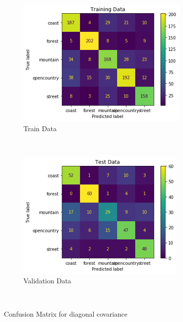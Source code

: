 


\begin{figure}[!h]
    \centering
    \begin{subfigure}[t]{0.5\textwidth}
        \centering
        \includegraphics[height=2.5in]{Dataset_2b/diagonal covariance train confusion matrix.png}
        \caption{Train Data}
    \end{subfigure}%
    ~ 
    \begin{subfigure}[t]{0.5\textwidth}
        \centering
        \includegraphics[height=2.5in]{Dataset_2b/diagonal covariance test confusion matrix.png}
        \caption{Validation Data}
    \end{subfigure}%
    ~
    \caption{Confusion Matrix for diagonal covariance}
    \label{fig:30}
\end{figure}

